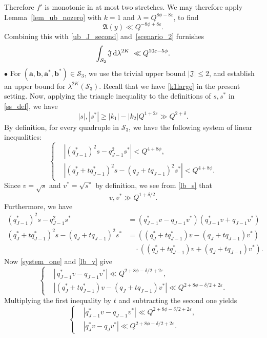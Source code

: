 \documentclass[12pt, reqno]{amsart}
\theoremstyle{definition}
\theoremstyle{remark}
\numberwithin{equation}{section}
\def\del{{\delta}} \def\Del{{\Delta}}
\def\lam{{\lambda}} \def\Lam{{\Lambda}} \def\Lamtil{{\widetilde \Lambda}}
\def\eps{\varepsilon}
\def\le{\leqslant} \def\ge{\geqslant}
\def\d{{\,{\rm d}}}
\def \ba {\mathbf a}
\def \bb {\mathbf b}
\def \fA {\mathfrak A}
\def \fJ {\mathfrak J}
\def \cS {\mathcal S}
\begin{document}
Therefore $f'$ is monotonic in at most two stretches. We may therefore apply Lemma~\ref{lem_ub_nozero} with $k=1$ and $\lambda=Q^{8\phi - 8\varepsilon}$, to find
\[
\fA(y)\ll Q^{-8\phi + 8\varepsilon}.
\]
Combining this with \eqref{ub_J_second} and~\eqref{scenario_2} furnishes
\begin{equation}
\label{Contribution2222}
\int_{\cS_2}\fJ \d \lam^{2K} 
\  \ll Q^{10\eps-5\phi}.
\end{equation}
$\bullet$ For $(\ba,\bb,\ba^*,\bb^*)\in\cS_3$, we use the trivial upper bound $|\fJ| \le 2$, and establish an upper bound for $\lambda^{2K}(\cS_3).$ Recall that we have
\eqref{k1large} in the present setting.
Now, applying the triangle inequality to the definitions of $s, s^*$ in \eqref{ss_def}, we have 
\begin{equation} \label{lb_s}
|s|, |s^*| \ge |k_1| - |k_2| Q^{1+2\eps} \gg Q^{2+\del}.
\end{equation}
By definition, for every quadruple in $\cS_3$, we have the following system of linear inequalities:
\begin{equation} \label{system_one}
\begin{cases}
&|({q_{J-1}^*})^2 s - q_{J-1}^2 s^*|<Q^{4+8\phi},\\
&\left|(q_J^* + t q_{J-1}^*)^2 s - (q_J + t q_{J-1})^2 s^*\right| < Q^{4+8\phi}.
\end{cases}
\end{equation}
Since $v=\sqrt{s}$ and $v^*=\sqrt{s^*}$ by definition, we see from \eqref{lb_s} that
\begin{equation} \label{lb_v}
v, v^* \gg Q^{1+\delta/2}.
\end{equation}
Furthermore, we have
\[
\begin{aligned}
(q_{J-1}^*)^2 s - q_{J-1}^2 s^*&=\left(q_{J-1}^* v - q_{J-1} v^*\right)\left(q_{J-1}^* v + q_{J-1} v^*\right)\\
(q_J^* + t q_{J-1}^*)^2 s - (q_J + t q_{J-1})^2 s^*
&=\left((q_J^* + t q_{J-1}^*) v - (q_J + t q_{J-1}) v^*\right) \\ 
& \quad \cdot \left((q_J^* + t q_{J-1}^*) v + (q_J + t q_{J-1}) v^*\right).
\end{aligned}
\]
Now \eqref{system_one} and
\eqref{lb_v} give
\begin{equation} \label{system_two}
\begin{cases}
&|\, q_{J-1}^* v - q_{J-1} v^*|\ll Q^{2+8\phi-\delta/2+2\varepsilon},  \\
&\left|(q_J^* + t q_{J-1}^*) v - (q_J + t q_{J-1}) v^*\right| \ll Q^{2+8\phi-\delta/2+2\varepsilon}.
\end{cases}
\end{equation}
Multiplying the first inequality by $t$ and subtracting the second one yields
\[
\begin{cases}
&|q_{J-1}^* v - q_{J-1} v^*|\ll Q^{2+8\phi-\delta/2+2\varepsilon},\\
&\left|q_J^* v - q_J v^*\right| \ll Q^{2+8\phi-\delta/2+2\varepsilon}.
\end{cases}
\]
\end{document}
